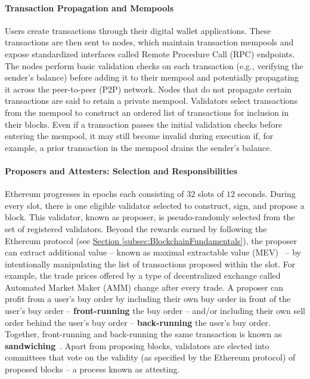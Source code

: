 \documentclass[a4paper]{article}
\theoremstyle{boldstyle}
\begin{document}
    \paragraph{Transaction Propagation and Mempools}
        Users create transactions through their digital wallet applications. These transactions are then sent to nodes, which maintain transaction mempools and expose standardized interfaces called Remote Procedure Call (RPC) endpoints. The nodes perform basic validation checks on each transaction (e.g., verifying the sender’s balance) before adding it to their mempool and potentially propagating it across the peer-to-peer (P2P) network. Nodes that do not propagate certain transactions are said to retain a private mempool. Validators select transactions from the mempool to construct an ordered list of transactions for inclusion in their blocks. Even if a transaction passes the initial validation checks before entering the mempool, it may still become invalid during execution if, for example, a prior transaction in the mempool drains the sender’s balance.  
        
    \paragraph{Proposers and Attesters: Selection and Responsibilities} \label{proposersAndAttesters}
Ethereum progresses in epochs each consisting of 32 slots of $12$ seconds. During every slot, there is one eligible validator selected to construct, sign, and propose a block. This validator, known as proposer, is pseudo-randomly selected from the set of registered validators. Beyond the rewards earned by following the Ethereum protocol (see \hyperref[subsec:BlockchainFundamentals]{Section \ref{subsec:BlockchainFundamentals}}), the proposer can extract additional value -- known as maximal extractable value (MEV)~\cite{W:MaximalExtractableValueMEV} -- by intentionally manipulating the list of transactions proposed within the slot. For example, the trade prices offered by a type of decentralized exchange called Automated Market Maker (AMM) change after every trade. A proposer can profit from a user's buy order by including their own buy order in front of the user's buy order -- \textbf{front-running} the buy order -- and/or including their own sell order behind the user's buy order -- \textbf{back-running} the user's buy order. Together, front-running and back-running the same transaction is known as \textbf{sandwiching}~\cite{W:MaximalExtractableValueMEV}. Apart from proposing blocks, validators are elected into committees that vote on the validity (as specified by the Ethereum protocol) of proposed blocks -- a process known as attesting. 
\end{document}
